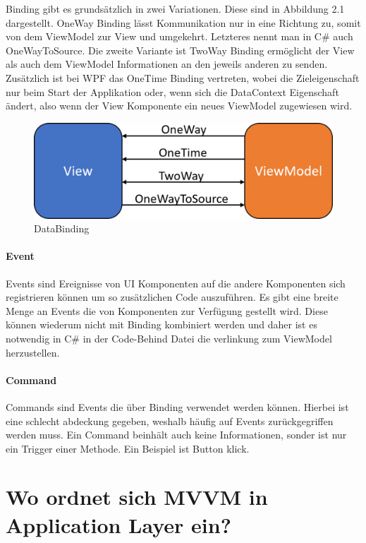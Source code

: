 \documentclass[titlepage=false,12pt]{scrreprt}
\begin{document}
Binding gibt es grundsätzlich in zwei Variationen. Diese sind in Abbildung 2.1 dargestellt. OneWay Binding
lässt Kommunikation nur in eine Richtung zu, somit von dem ViewModel zur View und umgekehrt.
Letzteres nennt man in C\# auch OneWayToSource. Die zweite Variante ist TwoWay Binding ermöglicht
der View als auch dem ViewModel Informationen an den jeweils anderen zu senden. Zusätzlich ist 
bei WPF das OneTime Binding vertreten, wobei die Zieleigenschaft nur beim Start der Applikation 
oder, wenn sich die DataContext Eigenschaft ändert, also wenn der View Komponente ein neues 
ViewModel zugewiesen wird.

\begin{figure}[h]
	\includegraphics[width=\textwidth]{Wpf_Binding.png}
	\caption[]{DataBinding}
\end{figure}


\paragraph{Event}

Events sind Ereignisse von UI Komponenten auf die andere Komponenten sich registrieren 
können um so zusätzlichen Code auszuführen. Es gibt eine breite Menge an Events die
von Komponenten zur Verfügung gestellt wird. Diese können wiederum nicht mit Binding 
kombiniert werden und daher ist es notwendig in C\# in der Code-Behind Datei
die verlinkung zum ViewModel herzustellen.

\paragraph{Command}

Commands sind Events die über Binding verwendet werden können. Hierbei ist eine schlecht
abdeckung gegeben, weshalb häufig auf Events zurückgegriffen werden muss. Ein Command
beinhält auch keine Informationen, sonder ist nur ein Trigger einer Methode. Ein Beispiel
ist Button klick.

\section{Wo ordnet sich MVVM in Application Layer ein?}
\end{document}
